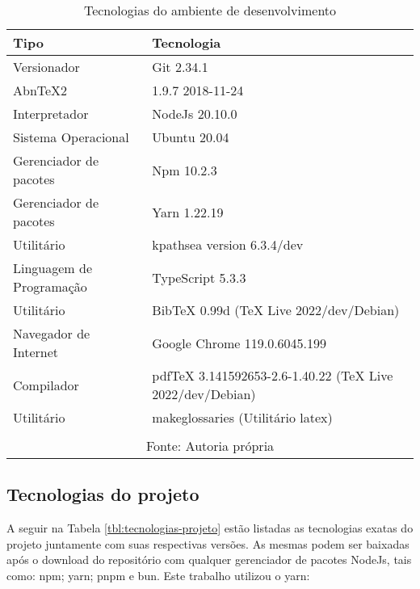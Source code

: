 \begin{table}[H]
    \centering
    \caption{Tecnologias do ambiente de desenvolvimento}
    \label{tbl:tecnologias-ambiente}
    \renewcommand{\arraystretch}{1.5}
    \begin{tabular}{p{6.4000cm} p{9.6000cm}}
        \hline
        \textbf{Tipo} & \textbf{Tecnologia} \\
        \hline
        Versionador & Git 2.34.1 \\
		AbnTeX2 & 1.9.7 2018-11-24 \\
		Interpretador & NodeJs 20.10.0 \\
		Sistema Operacional & Ubuntu 20.04 \\
		Gerenciador de pacotes & Npm 10.2.3 \\
		Gerenciador de pacotes & Yarn 1.22.19 \\
		Utilitário & kpathsea version 6.3.4/dev \\
		Linguagem de Programação & TypeScript 5.3.3 \\
		Utilitário & BibTeX 0.99d (TeX Live 2022/dev/Debian) \\
		Navegador de Internet & Google Chrome 119.0.6045.199 \\
		Compilador & pdfTeX 3.141592653-2.6-1.40.22 (TeX Live 2022/dev/Debian) \\
		Utilitário & makeglossaries (Utilitário \acrshort{latex}) \\
        \hline
        \\\multicolumn{2}{c}{\fontsize{10pt}{12pt}Fonte: Autoria própria}
    \end{tabular}
\end{table}

\subsection{Tecnologias do projeto}

A seguir
na
Tabela \ref{tbl:tecnologias-projeto}
estão listadas as tecnologias exatas do projeto juntamente com
suas respectivas versões. As mesmas podem ser baixadas após o download do
repositório com qualquer gerenciador de pacotes NodeJs, tais como: npm;
yarn; pnpm e bun. Este trabalho utilizou o yarn:

